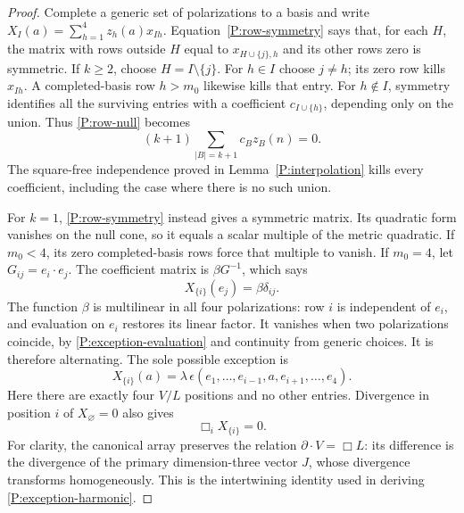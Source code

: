 \begin{proof}
Complete a generic set of polarizations to a basis and write
$X_I(a)=\sum_{h=1}^4z_h(a)x_{Ih}$.  Equation~\eqref{P:row-symmetry}
says that, for each $H$, the matrix with rows outside $H$ equal to
$x_{H\cup\{j\},h}$ and its other rows zero is symmetric.  If $k\geq2$,
choose $H=I\setminus\{j\}$.  For $h\in I$ choose $j\ne h$; its zero
row kills $x_{Ih}$.  A completed-basis row $h>m_0$ likewise kills that
entry.  For $h\notin I$, symmetry identifies all the surviving entries
with a coefficient $c_{I\cup\{h\}}$, depending only on the union.
Thus \eqref{P:row-null} becomes
\begin{equation}
 (k+1)\sum_{|B|=k+1}c_Bz_B(n)=0.
 \label{P:square-free-ward}
\end{equation}
The square-free independence proved in
Lemma~\ref{P:interpolation} kills every coefficient, including the case
where there is no such union.

For $k=1$, \eqref{P:row-symmetry} instead gives a symmetric matrix.
Its quadratic form vanishes on the null cone, so it equals a scalar
multiple of the metric quadratic.  If $m_0<4$, its zero completed-basis
rows force that multiple to vanish.  If $m_0=4$, let
$G_{ij}=e_i\cdot e_j$.  The coefficient matrix is $\beta G^{-1}$,
which says
\begin{equation}
 X_{\{i\}}(e_j)=\beta\delta_{ij}.
 \label{P:exception-evaluation}
\end{equation}
The function $\beta$ is multilinear in all four polarizations: row $i$
is independent of $e_i$, and evaluation on $e_i$ restores its linear
factor.  It vanishes when two polarizations coincide, by
\eqref{P:exception-evaluation} and continuity from generic choices.
It is therefore alternating.  The sole possible exception is
\begin{equation}
 X_{\{i\}}(a)=
 \lambda\,\epsilon(e_1,\ldots,e_{i-1},a,e_{i+1},\ldots,e_4).
 \label{P:alternating-exception}
\end{equation}
Here there are exactly four $V/L$ positions and no other entries.
Divergence in position $i$ of $X_\varnothing=0$ also gives
\begin{equation}
 \Box_iX_{\{i\}}=0.
 \label{P:exception-harmonic}
\end{equation}
For clarity, the canonical array preserves the relation
$\partial\cdot V=\Box L$: its difference is the divergence of the
primary dimension-three vector $J$, whose divergence transforms
homogeneously.  This is the intertwining identity used in deriving
\eqref{P:exception-harmonic}.


\end{proof}
